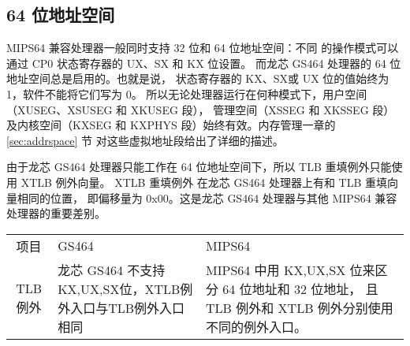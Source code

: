 
\subsection{64 位地址空间}

MIPS64 兼容处理器一般同时支持 32 位和 64 位地址空间：不同
的操作模式可以通过 CP0 状态寄存器的 UX、SX 和 KX
位设置。 而龙芯 GS464 处理器的 64 位地址空间总是启用的。也就是说，
状态寄存器的 KX、SX或 UX 位的值始终为 1，软件不能将它们写为 0。
所以无论处理器运行在何种模式下，用户空间（XUSEG、XSUSEG 和 XKUSEG 段），
管理空间（XSSEG 和 XKSSEG 段）及内核空间（KXSEG 和
KXPHYS 段）始终有效。内存管理一章的 \ref{sec:addrspace} 节
对这些虚拟地址段给出了详细的描述。

由于龙芯 GS464 处理器只能工作在 64 位地址空间下，所以 TLB 重填例外只能使用 XTLB
例外向量。 XTLB 重填例外 在龙芯 GS464 处理器上有和 TLB 重填向量相同的位置，
即偏移量为 0x00。这是龙芯 GS464 处理器与其他 MIPS64 兼容处理器的重要差别。

\begin{tabular}{|c|p{6.5cm}|p{6cm}|} \hline
  项目 & GS464 & MIPS64 \\ \hhline
  TLB 例外 &
  龙芯 GS464 不支持KX,UX,SX位，XTLB例外入口与TLB例外入口相同 &
  MIPS64 中用 KX,UX,SX 位来区分 64 位地址和 32 位地址， 且 TLB 例外和 XTLB
  例外分别使用不同的例外入口。 \\ \hline 
\end{tabular}

